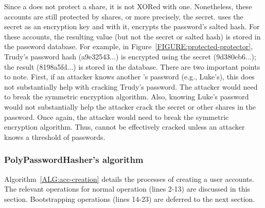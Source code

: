Since a \thresholdlessaccount  does not protect a share, it is not XORed with one.
Nonetheless, these accounts are still protected by shares, or more precisely,
the secret.  \PPH uses the secret as an encryption key and with it, encrypts the
password's salted hash.  For these accounts, the resulting value (but not the
secret or salted hash) is stored in the password database.  For example, in
Figure~\ref{FIGURE:protected-protector}, Trudy's password hash (a9e32543...) is
encrypted using the secret (9d380eb6...); the result (8198a5fd...) is stored in the
database.  There are two important points to note.  First, if an attacker knows
another \thresholdlessaccount's password (e.g., Luke's), this does not
substantially help with cracking Trudy's password.  The attacker would need to
break the symmetric encryption algorithm.  Also, knowing Luke's
password would not substantially help the attacker crack the secret or other
shares in the password.  Once again, the attacker would need to break the
symmetric encryption algorithm.  Thus, \thresholdlessaccounts cannot be
effectively cracked unless an attacker knows a threshold of \thresholdaccount 
passwords.

\subsubsection{PolyPasswordHasher's algorithm}
\label{SUBSUBSEC:pph-algorithm}

Algorithm~\ref{ALG:acc-creation} details the processes of creating a user 
accounts.  The relevant operations for normal operation (lines 2-13)
are discussed in this section.  Bootstrapping operations (lines 14-23) are
deferred to the next section.

